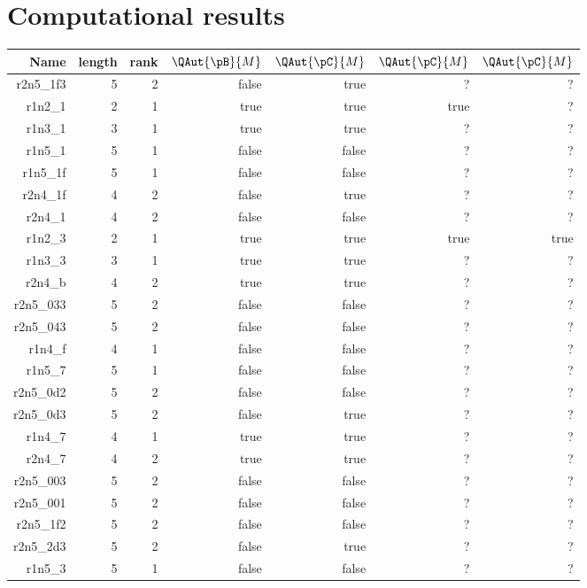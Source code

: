 
\appendix
\section{Computational results}
\begin{center}
    \small
\begin{longtable}{rrrrrrr}
 \hline  
  \textbf{Name} & \textbf{length} & \textbf{rank} & \textbf{$\QAut{\pB}{M}$} & \textbf{$\QAut{\pC}{M}$} & \textbf{$\QAut{\pC}{M}$} & \textbf{$\QAut{\pC}{M}$} \\ \hline
  r2n5\_1f3 & 5 & 2 & false & true & ? & ? \\ \hline
  r1n2\_1 & 2 & 1 & true & true & true & ? \\ \hline
  r1n3\_1 & 3 & 1 & true & true & ? & ? \\ \hline
  r1n5\_1 & 5 & 1 & false & false & ? & ? \\ \hline
  r1n5\_1f & 5 & 1 & false & false & ? & ? \\ \hline
  r2n4\_1f & 4 & 2 & false & true & ? & ? \\ \hline
  r2n4\_1 & 4 & 2 & false & false & ? & ? \\ \hline
  r1n2\_3 & 2 & 1 & true & true & true & true \\ \hline
  r1n3\_3 & 3 & 1 & true & true & ? & ? \\ \hline
  r2n4\_b & 4 & 2 & true & true & ? & ? \\ \hline
  r2n5\_033 & 5 & 2 & false & false & ? & ? \\ \hline
  r2n5\_043 & 5 & 2 & false & false & ? & ? \\ \hline
  r1n4\_f & 4 & 1 & false & false & ? & ? \\ \hline
  r1n5\_7 & 5 & 1 & false & false & ? & ? \\ \hline
  r2n5\_0d2 & 5 & 2 & false & false & ? & ? \\ \hline
  r2n5\_0d3 & 5 & 2 & false & true & ? & ? \\ \hline
  r1n4\_7 & 4 & 1 & true & true & ? & ? \\ \hline
  r2n4\_7 & 4 & 2 & true & true & ? & ? \\ \hline
  r2n5\_003 & 5 & 2 & false & false & ? & ? \\ \hline
  r2n5\_001 & 5 & 2 & false & false & ? & ? \\ \hline
  r2n5\_1f2 & 5 & 2 & false & false & ? & ? \\ \hline
  r2n5\_2d3 & 5 & 2 & false & true & ? & ? \\ \hline
  r1n5\_3 & 5 & 1 & false & false & ? & ? \\ \hline

\end{longtable}
\end{center}
